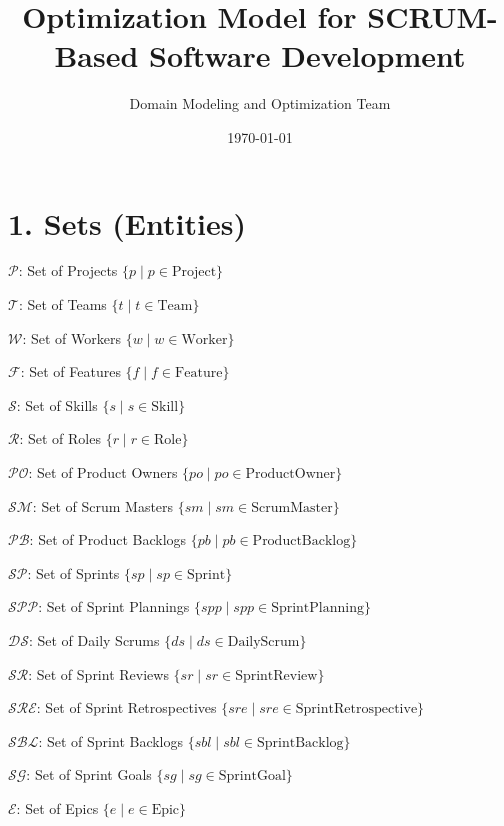 \documentclass[12pt]{article}
\title{Optimization Model for SCRUM-Based Software Development}
\author{Domain Modeling and Optimization Team}
\date{\today}
\begin{document}
\maketitle

\tableofcontents
\newpage

\section{1. Sets (Entities)}
\item $ \mathcal{P} $: Set of Projects $ \{ p \mid p \in \text{Project} \} $
    \item $ \mathcal{T} $: Set of Teams $ \{ t \mid t \in \text{Team} \} $
    \item $ \mathcal{W} $: Set of Workers $ \{ w \mid w \in \text{Worker} \} $
    \item $ \mathcal{F} $: Set of Features $ \{ f \mid f \in \text{Feature} \} $
    \item $ \mathcal{S} $: Set of Skills $ \{ s \mid s \in \text{Skill} \} $
    \item $ \mathcal{R} $: Set of Roles $ \{ r \mid r \in \text{Role} \} $
    \item $ \mathcal{PO} $: Set of Product Owners $ \{ po \mid po \in \text{ProductOwner} \} $
    \item $ \mathcal{SM} $: Set of Scrum Masters $ \{ sm \mid sm \in \text{ScrumMaster} \} $
    \item $ \mathcal{PB} $: Set of Product Backlogs $ \{ pb \mid pb \in \text{ProductBacklog} \} $
    \item $ \mathcal{SP} $: Set of Sprints $ \{ sp \mid sp \in \text{Sprint} \} $
    \item $ \mathcal{SPP} $: Set of Sprint Plannings $ \{ spp \mid spp \in \text{SprintPlanning} \} $
    \item $ \mathcal{DS} $: Set of Daily Scrums $ \{ ds \mid ds \in \text{DailyScrum} \} $
    \item $ \mathcal{SR} $: Set of Sprint Reviews $ \{ sr \mid sr \in \text{SprintReview} \} $
    \item $ \mathcal{SRE} $: Set of Sprint Retrospectives $ \{ sre \mid sre \in \text{SprintRetrospective} \} $
    \item $ \mathcal{SBL} $: Set of Sprint Backlogs $ \{ sbl \mid sbl \in \text{SprintBacklog} \} $
    \item $ \mathcal{SG} $: Set of Sprint Goals $ \{ sg \mid sg \in \text{SprintGoal} \} $
    \item $ \mathcal{E} $: Set of Epics $ \{ e \mid e \in \text{Epic} \} $
\end{document}
